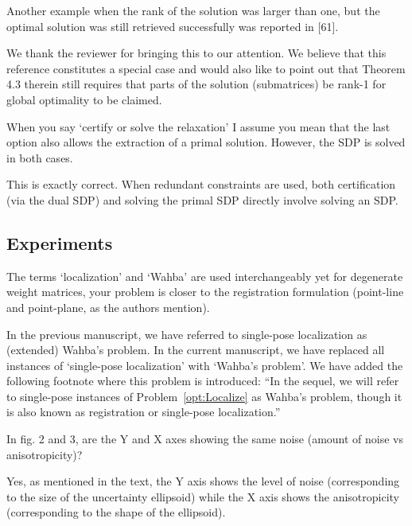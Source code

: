 Another example when the rank of the solution was larger than one, but the optimal solution was still retrieved successfully was reported in [61]. 
\begin{response}
    We thank the reviewer for bringing this to our attention. We believe that this reference constitutes a special case and would also like to point out that Theorem 4.3 therein still requires that parts of the solution (submatrices) be rank-1 for global optimality to be claimed.
\end{response}

When you say ‘certify or solve the relaxation’ I assume you mean that the last option also allows the extraction of a primal solution. However, the SDP is solved in both cases.
\begin{response}
    This is exactly correct. When redundant constraints are used, both certification (via the dual SDP) and solving the primal SDP directly involve solving an SDP.
\end{response}  

\subsection*{Experiments}

The terms ‘localization’ and ‘Wahba’ are used interchangeably yet for degenerate weight matrices, your problem is closer to the registration formulation (point-line and point-plane, as the authors mention). 
\begin{response}
    In the previous manuscript, we have referred to single-pose localization as (extended) Wahba's problem. In the current manuscript, we have replaced all instances of `single-pose localization' with `Wahba's problem'. We have added the following footnote where this problem is introduced: ``In the sequel, we will refer to single-pose instances of Problem~\ref{opt:Localize} as Wahba's problem, though it is also known as registration or single-pose localization.''
\end{response}

In fig. 2 and 3, are the Y and X axes showing the same noise (amount of noise vs anisotropicity)? 
\begin{response}
    Yes, as mentioned in the text, the Y axis shows the level of noise (corresponding to the size of the uncertainty ellipsoid) while the X axis shows the anisotropicity (corresponding to the shape of the ellipsoid).
\end{response}


